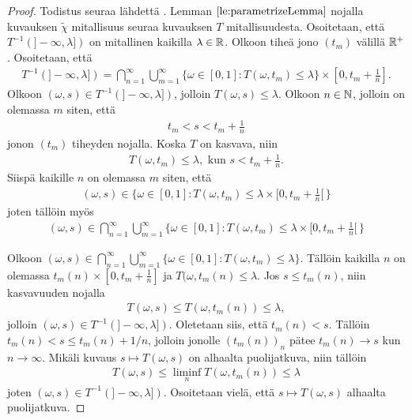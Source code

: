 \documentclass[12pt,oneside,a4paper]{amsbook} %
\begin{document}
\begin{proof}
    Todistus seuraa lähdettä \cite[s. 40]{optimal}. Lemman $\ref{le:parametrizeLemma}$ nojalla kuvauksen $\tilde \chi$ mitallisuus seuraa kuvauksen $T$ mitallisuudesta. Osoitetaan, että $T^{-1}(]-\infty, \lambda])$ on mitallinen kaikilla $\lambda \in \mathbb{R}$. Olkoon tiheä jono $(t_m)$ välillä ${\mathbb{R}^{+}}$. Osoitetaan, että
    \begin{align*}
        T^{-1}(]-\infty, \lambda]) = \bigcap_{n=1}^\infty \bigcup_{m=1}^\infty \{\omega \in [0, 1] : T(\omega, t_m) \le \lambda\} \times [0, t_m + \frac{1}{n}].
    \end{align*}
    Olkoon $(\omega, s) \in T^{-1}(]-\infty, \lambda])$, jolloin $T(\omega, s) \le \lambda$. Olkoon $n \in \mathbb{N}$, jolloin on olemassa $m$ siten, että 
    \begin{align*}
        t_m < s < t_m + \frac{1}{n}
    \end{align*}
    jonon $(t_m)$ tiheyden nojalla. Koska $T$ on kasvava, niin
    \begin{align*}
        T(\omega, t_m) \le \lambda, \text{ kun } s < t_m + \frac{1}{n}.
    \end{align*}
    Siispä kaikille $n$ on olemassa $m$ siten, että
    \begin{align*}
        (\omega, s) \in \{\omega \in [0, 1] : T(\omega, t_m) \le \lambda \times [0, t_m + \frac{1}{n}[ \, \}
    \end{align*}
    joten tällöin myös
    \begin{align*}
        (\omega, s) \in \bigcap_{n=1}^\infty \bigcup_{m=1}^\infty\{\omega \in [0, 1] : T(\omega, t_m) \le \lambda \times [0, t_m + \frac{1}{n}[ \, \}
    \end{align*}

    Olkoon $(\omega, s) \in \bigcap_{n=1}^\infty \bigcup_{m=1}^\infty \{\omega \in [0, 1] : T(\omega, t_m) \le \lambda\}.$ Tällöin kaikilla $n$ on olemassa $t_m(n) \times [0, t_m + \frac{1}{n}]$ ja $T(\omega, t_m(n) \le \lambda$. Jos $s \le t_m(n)$, niin kasvavuuden nojalla 
    \begin{align*}
        T(\omega, s) \le T(\omega, t_m(n)) \le \lambda,
    \end{align*}
    jolloin $(\omega, s) \in T^{-1}(]-\infty, \lambda])$. Oletetaan siis, että $t_m(n) < s$. Tällöin $t_m(n) < s \le t_m(n) + 1/n$, jolloin jonolle $(t_m(n))_n$ pätee $t_m(n) \to s$ kun $n \to \infty$. Mikäli kuvaus $s \mapsto T(\omega, s)$ on alhaalta puolijatkuva, niin tällöin
    \begin{align*}
        T(\omega, s) \le \liminf_n T(\omega, t_m(n)) \le \lambda
    \end{align*}
    joten $(\omega, s) \in T^{-1}(]-\infty, \lambda])$. Osoitetaan vielä, että $s \mapsto T(\omega, s)$ alhaalta puolijatkuva.
    

\end{proof}
\end{document}
